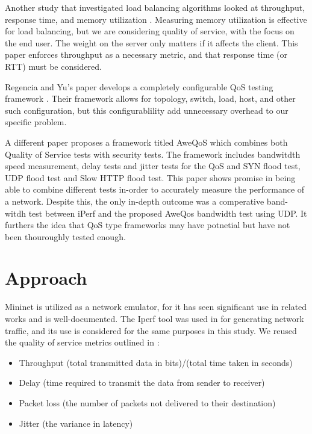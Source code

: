\documentclass{article}
\begin{document}
Another study that investigated load balancing algorithms looked at throughput, response time, and memory utilization \cite{babbar_2022}. Measuring memory utilization 
is effective for load balancing, but we are considering quality of service, with the focus on the end user. The weight on the server only matters if it affects the 
client. This paper enforces throughput as a necessary metric, and that response time (or RTT) must be considered. 

Regencia and Yu's paper develops a completely configurable QoS testing framework \cite{regencia_2021}. Their framework allows for topology, switch, load, host, and 
other such configuration, but this configurablility add unnecessary overhead to our specific problem. 

A different paper \cite{AweQoS_2020} proposes a framework titled AweQoS which combines both Quality of Service tests with security tests.    
The framework includes bandwitdth speed measurement, delay tests and jitter tests for the QoS and SYN flood test, UDP flood test and Slow HTTP flood test. 
This paper shows promise in being able to combine different tests in-order to accurately measure the performance of a network. Despite this, the only in-depth outcome 
was a comperative band-witdh test between iPerf and the proposed AweQos bandwidth test using UDP. It furthers the idea that QoS type frameworks may have potnetial but 
have not been thouroughly tested enough.

\section{Approach}
Mininet is utilized as a network emulator, for it has seen significant use in related works \cite{mininet_emulation_2014,qos_analysis_2022,chauhan_atulkar_2020} and 
is well-documented. The Iperf tool was used in \cite{chauhan_atulkar_2020} for generating network traffic, and its use is considered for the same purposes in this 
study. We reused the quality of service metrics outlined in \cite{qos_analysis_2022}: 
\begin{itemize}
    \item Throughput (total transmitted data in bits)/(total time taken in seconds)
    \item Delay (time required to transmit the data from sender to receiver)
    \item Packet loss (the number of packets not delivered to their destination)
    \item Jitter (the variance in latency)
\end{itemize} 
\end{document}

